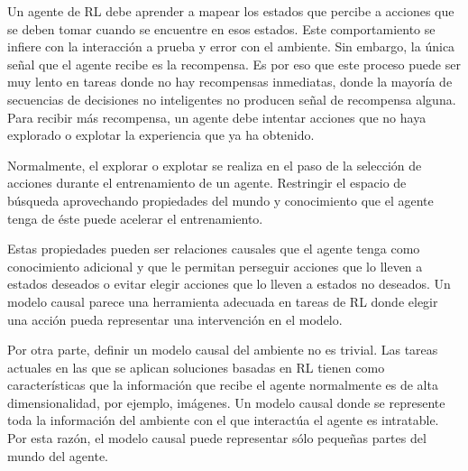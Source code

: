 Un agente de RL debe aprender a mapear los estados
que percibe a acciones que se deben tomar cuando
se encuentre en esos estados. Este comportamiento
se infiere con la interacción a prueba y error con el ambiente. Sin embargo, la única señal que el agente recibe es la recompensa. Es por eso que este proceso puede ser muy lento en tareas donde no hay recompensas inmediatas, donde la mayoría de secuencias
de decisiones no inteligentes no producen señal de recompensa alguna.
Para recibir más recompensa, un agente debe intentar acciones que no haya explorado o explotar la experiencia que ya ha obtenido.

Normalmente, el explorar o explotar se realiza en el 
paso de la selección de acciones durante el entrenamiento de un agente. Restringir el espacio de búsqueda aprovechando 
propiedades del mundo y conocimiento que el agente tenga
de éste puede acelerar el entrenamiento.

Estas propiedades pueden ser relaciones causales 
que el agente tenga como conocimiento adicional
y que le permitan perseguir acciones que lo lleven a
estados deseados o evitar elegir acciones que lo lleven a 
estados no deseados. Un modelo causal parece una herramienta adecuada en
tareas de RL donde elegir una acción pueda representar una intervención en el modelo.

Por otra parte, definir un modelo causal del ambiente no es trivial.
Las tareas actuales en las que se aplican soluciones 
basadas en RL tienen como características que la información
que recibe el agente normalmente es de alta dimensionalidad, por 
ejemplo, imágenes. Un modelo causal donde se represente toda
la información del ambiente con el que interactúa el agente
es intratable. 
Por esta razón, el modelo causal puede representar sólo pequeñas partes del mundo del agente.







